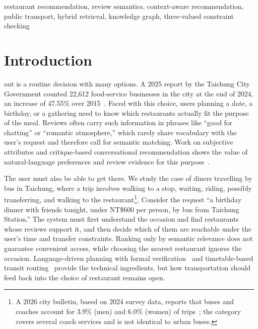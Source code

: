 \documentclass[conference]{IEEEtran}
\begin{document}
\begin{IEEEkeywords}
restaurant recommendation, review semantics, context-aware recommendation, public transport, hybrid retrieval, knowledge graph, three-valued constraint checking
\end{IEEEkeywords}

\section{Introduction}

 out is a routine decision with many options. A 2025 report by the Taichung City Government counted 22{,}612 food-service businesses in the city at the end of 2024, an increase of 47.55\% over 2015~\cite{taichung_eat_outside}. Faced with this choice, users planning a date, a birthday, or a gathering need to know which restaurants actually fit the purpose of the meal. Reviews often carry such information in phrases like ``good for chatting'' or ``romantic atmosphere,'' which rarely share vocabulary with the user's request and therefore call for semantic matching. Work on subjective attributes and critique-based conversational recommendation shows the value of natural-language preferences and review evidence for this purpose~\cite{subjective_attributes,critique_preference}.

The user must also be able to get there. We study the case of diners travelling by bus in Taichung, where a trip involves walking to a stop, waiting, riding, possibly transferring, and walking to the restaurant\footnote{A 2026 city bulletin, based on 2024 survey data, reports that buses and coaches account for 3.9\% (men) and 6.0\% (women) of trips~\cite{taichung_gender}; the category covers several coach services and is not identical to urban buses.}. Consider the request ``a birthday dinner with friends tonight, under NT\$600 per person, by bus from Taichung Station.'' The system must first understand the occasion and find restaurants whose reviews support it, and then decide which of them are reachable under the user's time and transfer constraints. Ranking only by semantic relevance does not guarantee convenient access, while choosing the nearest restaurant ignores the occasion. Language-driven planning with formal verification~\cite{llm_planning_tools} and timetable-based transit routing~\cite{bus_dynamic_replanning} provide the technical ingredients, but how transportation should feed back into the choice of restaurant remains open.
\end{document}
